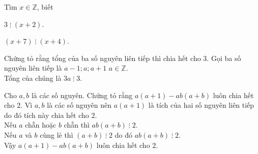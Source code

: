 \begin{bt}%
Tìm $ x\in \mathbb{Z} $, biết
\begin{enumEX}{2}
	\item $ 3 \;\vdots\;(x+2) $.
	\item $ (x+7) \;\vdots\; (x+4) $.
\end{enumEX}
\end{bt}

\begin{bt}%
Chứng tỏ rằng tổng của ba số nguyên liên tiếp thì chia hết cho $ 3 $.	
	\loigiai
	{
Gọi ba số nguyên liên tiếp là $ a-1; a; a+1 $ $ a\in \mathbb{Z} $.\\
Tổng của chúng là $ 3a \;\vdots \; 3 $.	
	}
\end{bt}

\begin{bt}%
Cho $ a, b $ là các số nguyên. Chứng tỏ rằng $ a(a+1)-ab(a+b) $ luôn chia hết cho $ 2 $.	
	\loigiai
	{
Vì $ a, b $ là các số nguyên nên $ a(a+1) $ là tích của hai số nguyên liên tiếp do đó tích này chia hết cho $ 2 $.\\
Nếu $ a $ chẵn hoặc $ b $ chẵn thì $ ab(a+b) \;\vdots \; 2$.\\
Nếu $ a $ và $ b $ cùng lẻ thì $ (a+b) \;\vdots \; 2$ do đó 	$ ab(a+b) \;\vdots \; 2$.\\
Vậy $ a(a+1)-ab(a+b) $ luôn chia hết cho $ 2 $.	
	}
\end{bt}